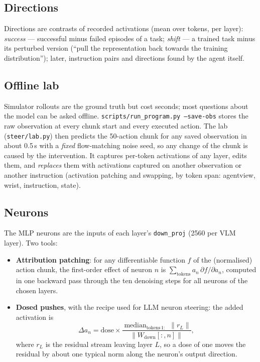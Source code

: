 \documentclass[11pt]{article}
\begin{document}
\subsection{Directions}
Directions are contrasts of recorded activations (mean over tokens, per layer):
\emph{success} --- successful minus failed episodes of a task; \emph{shift} --- a trained task minus its perturbed version
(``pull the representation back towards the training distribution''); later, instruction pairs and directions found by
the agent itself.

\subsection{Offline lab}
Simulator rollouts are the ground truth but cost seconds; most questions about the model can be asked offline.
\texttt{scripts/run\_program.py --save-obs} stores the raw observation at every chunk start and every executed action. The lab
(\texttt{steer/lab.py}) then predicts the 50-action chunk for any saved observation in about 0.5\,s with a \emph{fixed}
flow-matching noise seed, so any change of the chunk is caused by the intervention. It captures per-token activations of any
layer, edits them, and \emph{replaces} them with activations captured on another observation or another instruction (activation
patching and swapping, by token span: agentview, wrist, instruction, state).

\subsection{Neurons}
The MLP neurons are the inputs of each layer's \texttt{down\_proj} (2560 per VLM layer). Two tools:
\begin{itemize}
\item \textbf{Attribution patching}: for any differentiable function $f$ of the (normalised) action chunk, the first-order effect
of neuron $n$ is $\sum_{\text{tokens}} a_n\,\partial f/\partial a_n$, computed in one backward pass through the ten denoising
steps for all neurons of the chosen layers.
\item \textbf{Dosed pushes}, with the recipe used for LLM neuron steering: the added activation is
\[
\Delta a_n = \text{dose}\times\frac{\operatorname{median}_{\text{tokens}\,1:}\,\|r_L\|}{\|W_{\text{down}}[:,n]\|},
\]
where $r_L$ is the residual stream leaving layer $L$, so a dose of one moves the residual by about one typical norm along the
neuron's output direction.
\end{itemize}
\end{document}
